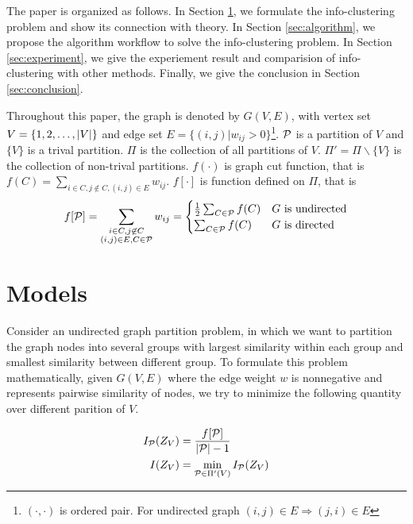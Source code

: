 \documentclass{article}
\begin{document}
The paper is organized as follows. In Section \ref{sec:models}, we formulate the info-clustering problem and show its connection with theory. In Section \ref{sec:algorithm}, we propose the algorithm workflow to solve the info-clustering problem. In Section \ref{sec:experiment}, we give the experiement result and comparision of info-clustering with other methods. Finally, we give the conclusion in Section \ref{sec:conclusion}.

Throughout this paper, the graph is denoted by $G(V,E)$, with vertex set $V = \{1, 2, \dots, \abs{V}\}$ and edge set $E=\{(i,j) | w_{ij}>0\}$\footnote{$(\cdot, \cdot)$ is ordered pair. For undirected graph $(i,j) \in E \Rightarrow (j,i) \in E$}. $\P$ is a partition of $V$ and $\{V\}$ is a trival partition. $\Pi$ is the collection of all partitions of $V$. $\Pi' = \Pi \backslash \{V\}$ is the collection of non-trival partitions. $f(\cdot)$ is graph cut function, that is $f(C) = \sum_{i\in C, j\not\in C, (i,j) \in E} w_{ij}$. $f[\cdot]$ is function defined on $\Pi$, that is
\begin{equation}
f[\P] = \sum_{\substack{i\in C, j \not\in C\\ (i,j)\in E, C\in \mathcal{P}}} w_{ij} =
\begin{cases}
\frac{1}{2} \sum_{C\in \P}f(C)   & G \textrm{ is undirected} \\
\sum_{C\in \P}f(C)   & G \textrm{ is directed}
\end{cases}
\end{equation}
\section{Models}\label{sec:models}

Consider an undirected graph partition problem, in which we want to partition the graph nodes into several groups with largest similarity within each group and smallest similarity between different group. To formulate this problem mathematically, given $G(V, E)$ where the edge weight $w$ is nonnegative and represents pairwise similarity of nodes, we try to minimize the following quantity over different parition of $V$.
\begin{definition}\label{def:ms}
\begin{align}
I_{\P}(Z_V) & = \frac{ f[\P] }{  \abs{\mathcal{P}} - 1 }\\
I(Z_V) & = \min_{\mathcal{P} \in \Pi'(V)} I_{\mathcal{P}}(Z_V)  \label{eq:ms}
\end{align}
\end{definition}
\end{document}

